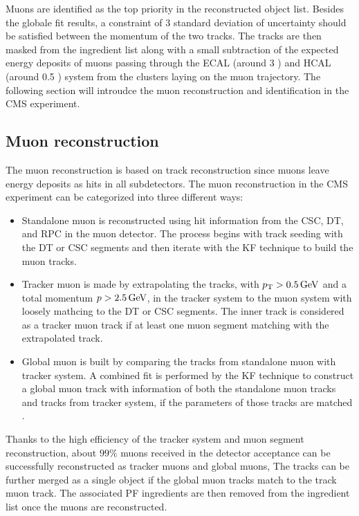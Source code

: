 Muons are identified as the top priority in the reconstructed object list.
Besides the globale fit results, a constraint of 3 standard deviation of uncertainty should be satisfied between the momentum of the two tracks.
The tracks are then masked from the ingredient list along with a small subtraction of the expected energy deposits of muons passing through the ECAL (around 3 \GeV) and HCAL (around 0.5 \GeV) system from the clusters laying on the muon trajectory.
The following section will introudce the muon reconstruction and identification in the CMS experiment.

\subsection{Muon reconstruction}
The muon reconstruction is based on track reconstruction since muons leave energy deposits as hits in all subdetectors.
The muon reconstruction in the CMS experiment can be categorized into three different ways:

\begin{itemize}
    \item Standalone muon is reconstructed using hit information from the CSC, DT, and RPC in the muon detector.
        The process begins with track seeding with the DT or CSC segments and then iterate with the KF technique to build the muon tracks.
    \item Tracker muon is made by extrapolating the tracks, with $p_{\mathrm{T}} > 0.5 \,\text{Ge\hspace{-.08em}V}$ and a total momentum $p > 2.5 \,\text{Ge\hspace{-.08em}V}$, in the tracker system to the muon system with loosely mathcing to the DT or CSC segments.
        The inner track is considered as a tracker muon track if at least one muon segment matching with the extrapolated track.
    \item Global muon is built by comparing the tracks from standalone muon with tracker system.
        A combined fit is performed by the KF technique to construct a global muon track with information of both the standalone muon tracks and tracks from tracker system, if the parameters of those tracks are matched .
\end{itemize}

Thanks to the high efficiency of the tracker system and muon segment reconstruction, about $99\%$ muons received in the detector acceptance can be successfully reconstructed as tracker muons and global muons,
The tracks can be further merged as a single object if the global muon tracks match to the track muon track.
The associated PF ingredients are then removed from the ingredient list once the muons are reconstructed.

